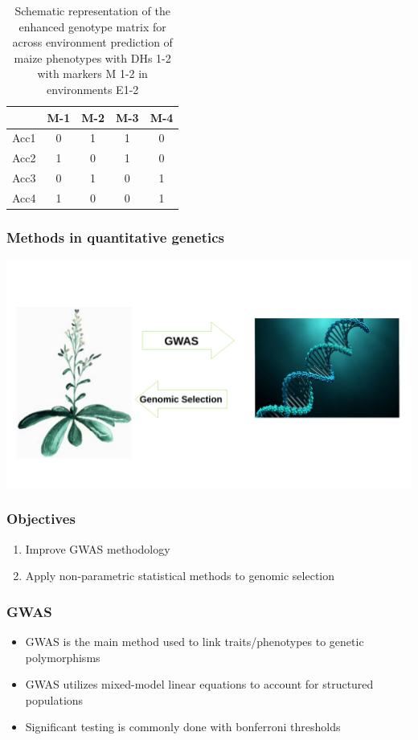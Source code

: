\documentclass{beamer}
\begin{document}
\begin{frame}
\begin{table}[H]
 \centering
 \caption[Environmentally enhanced marker matrix]{Schematic representation of the enhanced genotype matrix for across environment prediction of maize phenotypes with DHs 1-2 with markers M 1-2 in environments E1-2}
 \label{tab:envmarker}
 \begin{tabular}{l|cccc}
   \hline
        & M-1 & M-2 & M-3 & M-4 \\
   \hline
   Acc1 & 0   & 1   & 1   & 0   \\
   Acc2 & 1   & 0   & 1   & 0   \\
   Acc3 & 0   & 1   & 0   & 1   \\
   Acc4 & 1   & 0   & 0   & 1   \\
   \hline
 \end{tabular}
\end{table}
\end{frame}


\begin{frame}
  \frametitle{Methods in quantitative genetics}
  \includegraphics[height=.8\textheight,width=.9\textwidth]{bla.pdf}
\end{frame}

\begin{frame}
  \frametitle{Objectives}
  \begin{enumerate} [<+->]
  \item Improve GWAS methodology 
  \item Apply non-parametric statistical methods to genomic selection
  \end{enumerate}
\end{frame}

\begin{frame}
  \frametitle{GWAS}
  \begin{itemize}[<+->]
  \item GWAS is the main method used to link traits/phenotypes to genetic polymorphisms
  \item GWAS utilizes mixed-model linear equations to account for structured populations
  \item Significant testing is commonly done with bonferroni thresholds 
  \end{itemize}
\end{frame}
\end{document}
